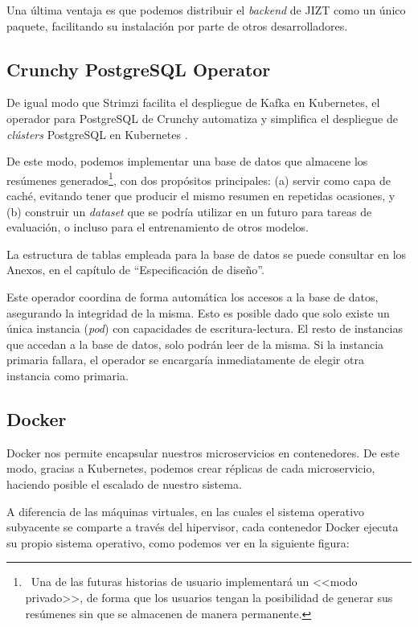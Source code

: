 Una última ventaja es que podemos distribuir el \emph{backend} de JIZT como un único paquete, facilitando su instalación por parte de otros desarrolladores.


\subsection{Crunchy PostgreSQL Operator}

De igual modo que Strimzi facilita el despliegue de Kafka en Kubernetes, el operador para PostgreSQL de Crunchy automatiza y simplifica el despliegue de \emph{clústers} PostgreSQL en Kubernetes \cite{crunchy21}.

De este modo, podemos implementar una base de datos que almacene los resúmenes generados\footnote{\, Una de las futuras historias de usuario implementará un <<modo privado>>, de forma que los usuarios tengan la posibilidad de generar sus resúmenes sin que se almacenen de manera permanente.}, con dos propósitos principales: (a) servir como capa de caché, evitando tener que producir el mismo resumen en repetidas ocasiones, y (b) construir un \emph{dataset} que se podría utilizar en un futuro para tareas de evaluación, o incluso para el entrenamiento de otros modelos.

La estructura de tablas empleada para la base de datos se puede consultar en los Anexos, en el capítulo de ``Especificación de diseño''.

Este operador coordina de forma automática los accesos a la base de datos, asegurando la integridad de la misma. Esto es posible dado que solo existe un única instancia (\emph{pod}) con capacidades de escritura-lectura. El resto de instancias que accedan a la base de datos, solo podrán leer de la misma. Si la instancia primaria fallara, el operador se encargaría inmediatamente de elegir otra instancia como primaria.


\subsection{Docker}

Docker nos permite encapsular nuestros microservicios en contenedores. De este modo, gracias a Kubernetes, podemos crear réplicas de cada microservicio, haciendo posible el escalado de nuestro sistema.

A diferencia de las máquinas virtuales, en las cuales el sistema operativo subyacente se comparte a través del hipervisor, cada contenedor Docker ejecuta su propio sistema operativo, como podemos ver en la siguiente figura:

